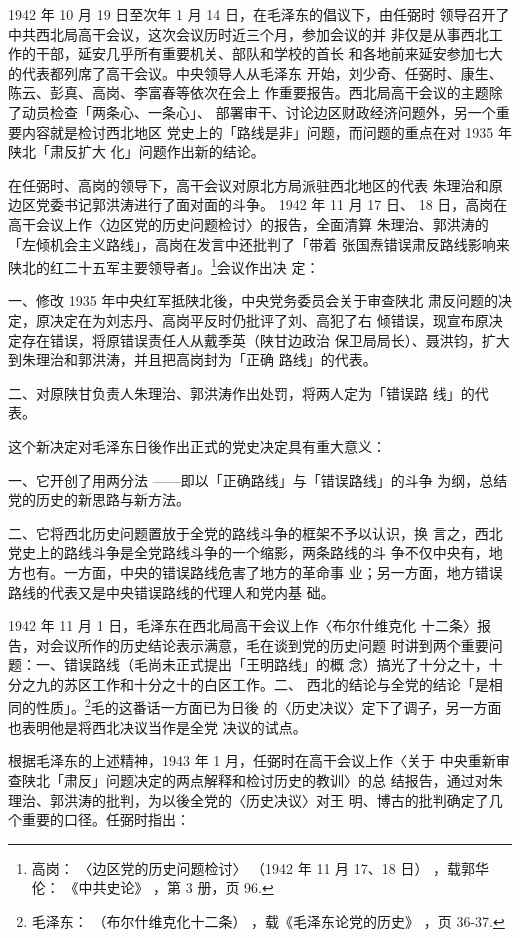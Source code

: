 1942 年 10 月 19 日至次年 1 月 14 日，在毛泽东的倡议下，由任弼时
领导召开了中共西北局高干会议，这次会议历时近三个月，参加会议的并
非仅是从事西北工作的干部，延安几乎所有重要机关、部队和学校的首长
和各地前来延安参加七大的代表都列席了高干会议。中央领导人从毛泽东
开始，刘少奇、任弼时、康生、陈云、彭真、高岗、李富春等依次在会上
作重要报告。西北局高干会议的主题除了动员检查「两条心、一条心」、
部署审干、讨论边区财政经济问题外，另一个重要内容就是检讨西北地区
党史上的「路线是非」问题，而问题的重点在对 1935 年陕北「肃反扩大
化」问题作出新的结论。

在任弼时、高岗的领导下，高干会议对原北方局派驻西北地区的代表
朱理治和原边区党委书记郭洪涛进行了面对面的斗争。
1942 年 11 月 17 日、
18 日，高岗在高干会议上作〈边区党的历史问题检讨〉的报告，全面清算
朱理治、郭洪涛的「左倾机会主义路线」，高岗在发言中还批判了「带着
张国焘错误肃反路线影响来陕北的红二十五军主要领导者」。\footnote{高岗：
〈边区党的历史问题检讨〉
（1942 年 11 月 17、18 日）
，载郭华伦：
《中共史论》
，第 3 册，页 96.}会议作出决
定：

一、修改 1935 年中央红军抵陕北後，中央党务委员会关于审查陕北
肃反问题的决定，原决定在为刘志丹、高岗平反时仍批评了刘、高犯了右
倾错误，现宣布原决定存在错误，将原错误责任人从戴季英（陕甘边政治
保卫局局长）、聂洪钧，扩大到朱理治和郭洪涛，并且把高岗封为「正确
路线」的代表。

二、对原陕甘负责人朱理治、郭洪涛作出处罚，将两人定为「错误路
线」的代表。

这个新决定对毛泽东日後作出正式的党史决定具有重大意义：

一、它开创了用两分法 ——即以「正确路线」与「错误路线」的斗争
为纲，总结党的历史的新思路与新方法。

二、它将西北历史问题置放于全党的路线斗争的框架不予以认识，换
言之，西北党史上的路线斗争是全党路线斗争的一个缩影，两条路线的斗
争不仅中央有，地方也有。一方面，中央的错误路线危害了地方的革命事
业；另一方面，地方错误路线的代表又是中央错误路线的代理人和党内基
础。

1942 年 11 月 1 日，毛泽东在西北局高干会议上作〈布尔什维克化
十二条〉报告，对会议所作的历史结论表示满意，毛在谈到党的历史问题
时讲到两个重要问题：一、错误路线（毛尚未正式提出「王明路线」的概
念）搞光了十分之十，十分之九的苏区工作和十分之十的白区工作。二、
西北的结论与全党的结论「是相同的性质」。\footnote{毛泽东：
（布尔什维克化十二条）
，载《毛泽东论党的历史》
，页 36-37.
}毛的这番话一方面已为日後
的〈历史决议〉定下了调子，另一方面也表明他是将西北决议当作是全党
决议的试点。
 
根据毛泽东的上述精神，1943 年 1 月，任弼时在高干会议上作〈关于
中央重新审查陕北「肃反」问题决定的两点解释和检讨历史的教训〉的总
结报告，通过对朱理治、郭洪涛的批判，为以後全党的〈历史决议〉对王
明、博古的批判确定了几个重要的口径。任弼时指出：

